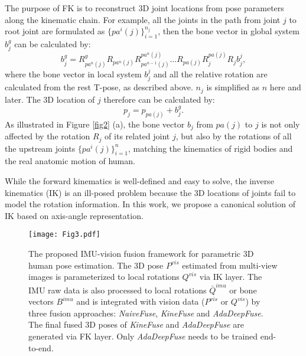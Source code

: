 \documentclass[lettersize,journal]{IEEEtran}
\begin{document}
The purpose of FK is to reconstruct 3D joint locations from pose parameters along the kinematic chain. For example, all the joints in the path from joint $j$ to root joint are formulated as $\lbrace pa^{i}(j) \rbrace_{i=1}^{n_{j}}$, then the bone vector in global system $b_{j}^{g}$ can be calculated by:
\begin{equation}
b_{j}^{g} =  
R_{pa^{n}(j)}^{g} 
R_{pa^{n}(j)} 
R_{pa^{n-1}(j)}^{pa^{n}(j)}
...
R_{pa(j)}
R_{j}^{pa(j)}
R_{j} 
b_{j}^{j} \label{equa2},
\end{equation}
where the bone vector in local system $b_{j}^{j}$ and all the relative rotation are calculated from the rest T-pose, as described above. $n_{j}$ is simplified as $n$ here and later. The 3D location of $j$ therefore can be calculated by:
\begin{equation}
p_{j} = p_{pa(j)} + b_{j}^{g} \label{equa3}.
\end{equation}
As illustrated in Figure \ref{fig2} (a),  the bone vector $b_{j}$ from $pa(j)$ to $j$ is not only affected by the rotation $R_{j}$ of its related joint $j$, but also by the rotations of all the upstream joints $\lbrace pa^{i}(j) \rbrace_{i=1}^{n}$, matching the kinematics of rigid bodies and the real anatomic motion of human. 

While the forward kinematics is well-defined and easy to solve, the inverse kinematics (IK) is an ill-posed problem because the 3D locations of joints fail to model the rotation information. In this work, we propose a canonical solution of IK based on axis-angle representation.

\begin{figure*}[ht]
 \begin{center}
 	\centerline{\texttt{[image: Fig3.pdf]}}
\caption{The proposed IMU-vision fusion framework for parametric 3D human pose estimation. The 3D pose $P^{vis}$ estimated from multi-view images is parameterized to local rotations $Q^{vis}$ via IK layer. The IMU raw data is also processed to local rotations $\bar{Q}^{imu}$ or bone vectors $B^{imu}$ and is integrated with vision data ($P^{vis}$ or $Q^{vis}$) by three fusion approaches: \emph{NaiveFuse}, \emph{KineFuse} and \emph{AdaDeepFuse}. The final fused 3D poses of \emph{KineFuse} and \emph{AdaDeepFuse} are generated via FK layer. Only \emph{AdaDeepFuse} needs to be trained end-to-end.}
\label{fig:framework}
\end{center}
\end{figure*}
\end{document}
